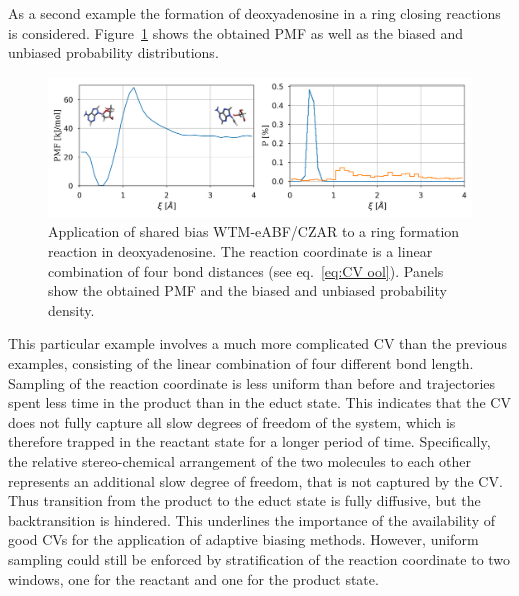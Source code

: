 As a second example the formation of deoxyadenosine in a ring closing reactions is considered.
Figure~\ref{fig:ool results} shows the obtained PMF as well as the biased and unbiased probability distributions.
\begin{figure}[H]
  \centering
    \includegraphics[width=0.999\textwidth]{bilder/ool}
  \caption{
    Application of shared bias WTM-eABF/CZAR to a ring formation reaction in deoxyadenosine. The reaction coordinate is a linear combination of four bond distances (see eq.~\ref{eq:CV ool}). Panels show the obtained PMF and the biased and unbiased probability density.
  }
  \label{fig:ool results}
\end{figure}
This particular example involves a much more complicated CV than the previous examples, consisting of the linear combination of four different bond length.
Sampling of the reaction coordinate is less uniform than before and trajectories spent less time in the product than in the educt state.
This indicates that the CV does not fully capture all slow degrees of freedom of the system, which is therefore trapped in the reactant state for a longer period of time.
Specifically, the relative stereo-chemical arrangement of the two molecules to each other represents an additional slow degree of freedom, that is not captured by the CV.
Thus transition from the product to the educt state is fully diffusive, but the backtransition is hindered.
This underlines the importance of the availability of good CVs for the application of adaptive biasing methods.
However, uniform sampling could still be enforced by stratification of the reaction coordinate to two windows, one for the reactant and one for the product state.
